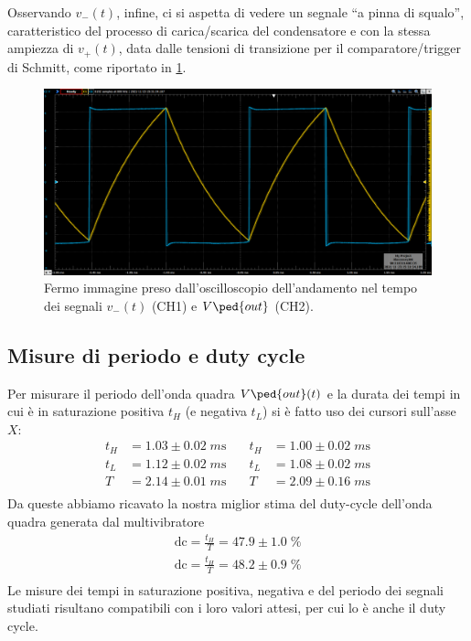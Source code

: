\documentclass[10pt, a4paper, italian]{article}
\begin{document}
Osservando $v_- (t)$, infine, ci si aspetta di vedere un segnale ``a pinna di
squalo'', caratteristico del processo di carica/scarica del condensatore e
con la stessa ampiezza di $v_+ (t)$, data dalle tensioni di transizione per
il comparatore/trigger di Schmitt, come riportato in \cref{fig: v-vout}.
\begin{figure}[htbp]
\centering
\includegraphics[scale=0.4]{V-Vout}
\caption{Fermo immagine preso dall'oscilloscopio dell'andamento nel tempo dei
segnali $v_- (t)$ (CH1) e $V\ped{out}$ (CH2). \label{fig: v-vout}}
\end{figure}

\subsection{Misure di periodo e duty cycle}
Per misurare il periodo dell'onda quadra $V\ped{out} (t)$ e la durata dei
tempi in cui è in saturazione positiva $t_H$ (e negativa $t_L$) si è fatto
uso dei cursori sull'asse $X$:
\begin{align*}
t_H &= 1.03 \pm 0.02 \; \si{m\s} &\quad t_H &= 1.00 \pm 0.02 \; \si{m\s} \\
t_L &= 1.12 \pm 0.02 \; \si{m\s} &\quad t_L &= 1.08 \pm 0.02 \; \si{m\s} \\
T &= 2.14 \pm 0.01 \; \si{m\s}  &\quad T &= 2.09 \pm 0.16 \; \si{m\s} \\
\end{align*}
Da queste abbiamo ricavato la nostra miglior stima del duty-cycle dell'onda
quadra generata dal multivibratore
\begin{align*}
\mathrm{dc} = \frac{t_H}{T} = 47.9 \pm 1.0 \; \% \\
\mathrm{dc} = \frac{t_H}{T} = 48.2 \pm 0.9 \; \% \\
\end{align*}
Le misure dei tempi in saturazione positiva, negativa e del periodo dei
segnali studiati risultano compatibili con i loro valori attesi, per cui
lo è anche il duty cycle.
\end{document}
